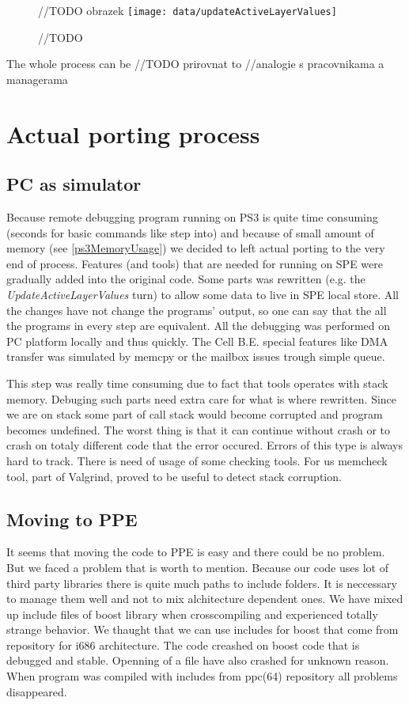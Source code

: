 \begin{figure}	//TODO obrazek
    \centering
    \texttt{[image: data/updateActiveLayerValues]}
    \caption[Diagram of new design components]{//TODO}
    \label{fg:updateActiveLayerValues}
\end{figure}

The whole process can be //TODO prirovnat to
//analogie s pracovnikama a managerama

\section{Actual porting process}

\subsection{PC as simulator}
Because remote debugging program running on PS3 is quite time consuming (seconds for basic commands like step into) and because of small amount of memory (see \ref{ps3MemoryUsage}) we decided to left actual porting to the very end of process.
Features (and tools) that are needed for running on SPE were gradually added into the original code.
Some parts was rewritten (e.g. the \emph{UpdateActiveLayerValues} turn) to allow some data to live in SPE local store.
All the changes have not change the programs' output, so one can say that the all the programs in every step are equivalent.
All the debugging was performed on PC platform locally and thus quickly.
The Cell B.E. special features like DMA transfer was simulated by memcpy or the mailbox issues trough simple queue.

\par
This step was really time consuming due to fact that tools operates with stack memory.
Debuging such parts need extra care for what is where rewritten.
Since we are on stack some part of call stack would become corrupted and program becomes undefined.
The worst thing is that it can continue without crash or to crash on totaly different code that the error occured.
Errors of this type is always hard to track.
There is need of usage of some checking tools.
For us memcheck tool, part of Valgrind, proved to be useful to detect stack corruption.

\subsection{Moving to PPE}

\par
It seems that moving the code to PPE is easy and there could be no problem.
But we faced a problem that is worth to mention.
Because our code uses lot of third party libraries there is quite much paths to include folders.
It is neccessary to manage them well and not to mix alchitecture dependent ones.
We have mixed up include files of boost library when crosscompiling and experienced totally strange behavior.
We thaught that we can use includes for boost that come from repository for i686 architecture.
The code creashed on boost code that is debugged and stable.
Openning of a file have also crashed for unknown reason.
When program was compiled with includes from ppc(64) repository all problems disappeared.

